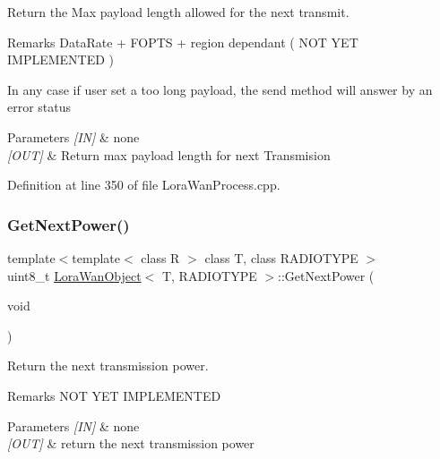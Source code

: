 Return the Max payload length allowed for the next transmit. 

\begin{DoxyRemark}{Remarks}
Data\+Rate + F\+O\+P\+TS + region dependant ( N\+OT Y\+ET I\+M\+P\+L\+E\+M\+E\+N\+T\+ED ) 

In any case if user set a too long payload, the send method will answer by an error status 
\end{DoxyRemark}

\begin{DoxyParams}{Parameters}
{\em \mbox{[}\+I\+N\mbox{]}} & none \\
\hline
{\em \mbox{[}\+O\+U\+T\mbox{]}} & Return max payload length for next Transmision \\
\hline
\end{DoxyParams}


Definition at line 350 of file Lora\+Wan\+Process.\+cpp.

\mbox{\label{class_lora_wan_object_ac833ad6ffd937e093709f6fc309e2276}} 
\subsubsection{\texorpdfstring{Get\+Next\+Power()}{GetNextPower()}}
{\footnotesize\ttfamily template$<$template$<$ class R $>$ class T, class R\+A\+D\+I\+O\+T\+Y\+PE $>$ \\
uint8\+\_\+t \mbox{\hyperlink{class_lora_wan_object}{Lora\+Wan\+Object}}$<$ T, R\+A\+D\+I\+O\+T\+Y\+PE $>$\+::Get\+Next\+Power (\begin{DoxyParamCaption}\item[{void}]{ }\end{DoxyParamCaption})}



Return the next transmission power. 

\begin{DoxyRemark}{Remarks}
N\+OT Y\+ET I\+M\+P\+L\+E\+M\+E\+N\+T\+ED 
\end{DoxyRemark}

\begin{DoxyParams}{Parameters}
{\em \mbox{[}\+I\+N\mbox{]}} & none \\
\hline
{\em \mbox{[}\+O\+U\+T\mbox{]}} & return the next transmission power \\
\hline
\end{DoxyParams}


